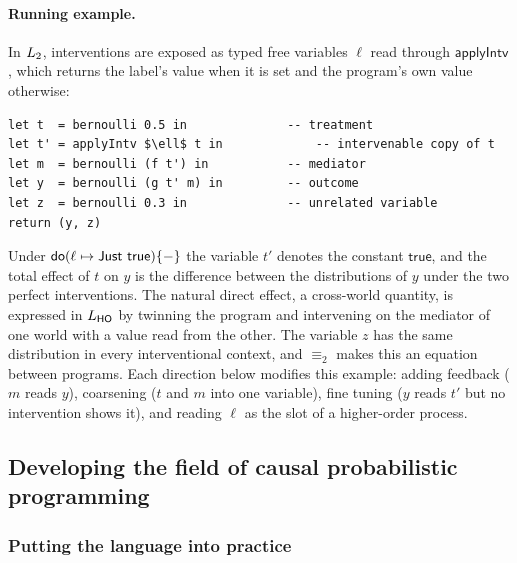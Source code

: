 \paragraph{Running example.} In $L_{2}$, interventions are exposed as typed free variables $\ell$ read through $\mathsf{applyIntv}$, which returns the label's value when it is set and the program's own value otherwise:
\begin{lstlisting}
let t  = bernoulli 0.5 in              -- treatment
let t' = applyIntv $\ell$ t in             -- intervenable copy of t
let m  = bernoulli (f t') in           -- mediator
let y  = bernoulli (g t' m) in         -- outcome
let z  = bernoulli 0.3 in              -- unrelated variable
return (y, z)
\end{lstlisting}
Under $\dok(\ell\mapsto\mathsf{Just}\ \mathsf{true})\{-\}$ the variable $t'$ denotes the constant $\mathsf{true}$, and the total effect of $t$ on $y$ is the difference between the distributions of $y$ under the two perfect interventions. The natural direct effect, a cross-world quantity, is expressed in $L_{\mathsf{HO}}$ by twinning the program and intervening on the mediator of one world with a value read from the other. The variable $z$ has the same distribution in every interventional context, and $\equiv_2$ makes this an equation between programs. Each direction below modifies this example: adding feedback ($m$ reads $y$), coarsening ($t$ and $m$ into one variable), fine tuning ($y$ reads $t'$ but no intervention shows it), and reading $\ell$ as the slot of a higher-order process.

\subsection{Developing the field of causal probabilistic programming}

\subsubsection{Putting the language into practice}\label{sec:prop-practice}

